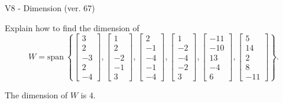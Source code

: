 \begin{exercise}
  \begin{exerciseTitle}V8 - Dimension (ver. 67)\end{exerciseTitle}
  \begin{exerciseStatement}
    Explain how to find the dimension of 
\[W=\mathrm{span}\ \left\{\left[\begin{array}{r}
3 \\
2 \\
-3 \\
2 \\
-4
\end{array}\right] , \left[\begin{array}{r}
1 \\
2 \\
-2 \\
-1 \\
3
\end{array}\right] , \left[\begin{array}{r}
2 \\
-1 \\
-4 \\
-1 \\
-4
\end{array}\right] , \left[\begin{array}{r}
1 \\
-2 \\
-4 \\
-2 \\
3
\end{array}\right] , \left[\begin{array}{r}
-11 \\
-10 \\
13 \\
-4 \\
6
\end{array}\right] , \left[\begin{array}{r}
5 \\
14 \\
2 \\
8 \\
-11
\end{array}\right]\right\}.\]



  \end{exerciseStatement}
  \begin{exerciseAnswer}
   The dimension of \(W\) is  \(4\).
  


  \end{exerciseAnswer}
\end{exercise}